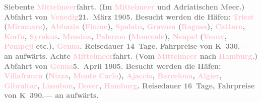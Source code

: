 \documentclass[twoside=false,titlepage=false,open=any, parskip=never, fontsize=12pt, headings=small, chapterprefix=false, appendixprefix=false]{scrbook}
\begin{document}
           \textcolor{gray}{\textbf{\textbf{Siebente \textcolor{pink}{Mittelmeer}{}\ledrightnote{\textcolor{pink}{Mittelmeer}}fahrt.}
                  (Im \textcolor{pink}{Mittelmeer}{}\ledrightnote{\textcolor{pink}{Mittelmeer}} und Adriatischen Meer.) Abfahrt
                  von \textcolor{pink}{Venedig}{}\ledrightnote{\textcolor{pink}{Venedig}}{ }\textbf{21. März 1905}. Besucht werden die Häfen: \textcolor{pink}{Triest}{}\ledrightnote{\textcolor{pink}{Triest}} (\textcolor{pink}{Miramare}{}\ledrightnote{\textcolor{pink}{Schloss Miramare}}), \textcolor{pink}{Abbazia}{}\ledrightnote{\textcolor{pink}{Opatija}} (\textcolor{pink}{Fiume}{}\ledrightnote{\textcolor{pink}{Rijeka}}), \textcolor{pink}{Spalato}{}\ledrightnote{\textcolor{pink}{Split}}, \textcolor{pink}{Gravosa}{}\ledrightnote{\textcolor{pink}{Dubrovnik}} (\textcolor{pink}{Ragusa}{}\ledrightnote{\textcolor{pink}{Dubrovnik}}), \textcolor{pink}{Cattaro}{}\ledrightnote{\textcolor{pink}{Kotor}}, \textcolor{pink}{Korfu}{}\ledrightnote{\textcolor{pink}{Korfu}}, \textcolor{pink}{Syrakus}{}\ledrightnote{\textcolor{pink}{Syrakus}}. \textcolor{pink}{Messina}{}\ledrightnote{\textcolor{pink}{Messina}}, \textcolor{pink}{Palermo}{}\ledrightnote{\textcolor{pink}{Palermo}} (\textcolor{pink}{Monreale}{}\ledrightnote{\textcolor{pink}{Monreale}}), \textcolor{pink}{Neapel}{}\ledrightnote{\textcolor{pink}{Neapel}} (\textcolor{pink}{Vesuv}{}\ledrightnote{\textcolor{pink}{Vesuv}}, \textcolor{pink}{Pompeji}{}\ledrightnote{\textcolor{pink}{Pompei}} etc.), \textcolor{pink}{Genua}{}\ledrightnote{\textcolor{pink}{Genua}}. Reisedauer 14 Tage. Fahrpreise von \textbf{K 330.—} an aufwärts.}}\pend
           \pstart
           \textcolor{gray}{\textbf{\textbf{Achte \textcolor{pink}{Mittelmeer}{}\ledrightnote{\textcolor{pink}{Mittelmeer}}fahrt.}
                  (Vom \textcolor{pink}{Mittelmeer}{}\ledrightnote{\textcolor{pink}{Mittelmeer}} nach \textcolor{pink}{Hamburg}{}\ledrightnote{\textcolor{pink}{Hamburg}}.) Abfahrt von \textcolor{pink}{Genua}{}\ledrightnote{\textcolor{pink}{Genua}}{ }\textbf{5. April 1905}. Besucht werden die Häfen: \textcolor{pink}{Villafranca}{}\ledrightnote{\textcolor{pink}{Villefranche-sur-Mer}}
                     (\textcolor{pink}{Nizza}{}\ledrightnote{\textcolor{pink}{Nizza}}, \textcolor{pink}{Monte
                     Carlo}{}\ledrightnote{\textcolor{pink}{Monte Carlo}}), \textcolor{pink}{Ajaccio}{}\ledrightnote{\textcolor{pink}{Ajaccio}}, \textcolor{pink}{Barcelona}{}\ledrightnote{\textcolor{pink}{Barcelona}}, \textcolor{pink}{Algier}{}\ledrightnote{\textcolor{pink}{Algiers}}, \textcolor{pink}{Gibraltar}{}\ledrightnote{\textcolor{pink}{Gibraltar}}, \textcolor{pink}{Lissabon}{}\ledrightnote{\textcolor{pink}{Lissabon}}, \textcolor{pink}{Dover}{}\ledrightnote{\textcolor{pink}{Dover}}, \textcolor{pink}{Hamburg}{}\ledrightnote{\textcolor{pink}{Hamburg}}. Reisedauer 16 Tage, Fahrpreise von \textbf{K 390.—} an aufwärts.}}\pend
\end{document}
